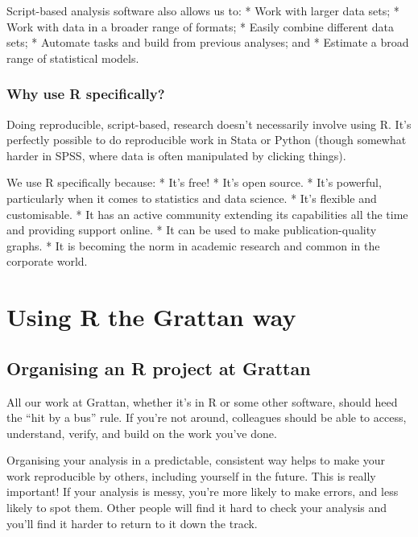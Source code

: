 \documentclass[]{book}
\begin{document}
Script-based analysis software also allows us to:
* Work with larger data sets;
* Work with data in a broader range of formats;
* Easily combine different data sets;
* Automate tasks and build from previous analyses; and
* Estimate a broad range of statistical models.

\hypertarget{why-R}{%
\section{Why use R specifically?}\label{why-R}}

Doing reproducible, script-based, research doesn't necessarily involve using R. It's perfectly possible to do reproducible work in Stata or Python (though somewhat harder in SPSS, where data is often manipulated by clicking things).

We use R specifically because:
* It's free!
* It's open source.
* It's powerful, particularly when it comes to statistics and data science.
* It's flexible and customisable.
* It has an active community extending its capabilities all the time and providing support online.
* It can be used to make publication-quality graphs.
* It is becoming the norm in academic research and common in the corporate world.

\hypertarget{part-using-r-the-grattan-way}{%
\part{Using R the Grattan way}\label{part-using-r-the-grattan-way}}

\hypertarget{organising-projects}{%
\chapter{Organising an R project at Grattan}\label{organising-projects}}

All our work at Grattan, whether it's in R or some other software, should heed the ``hit by a bus'' rule. If you're not around, colleagues should be able to access, understand, verify, and build on the work you've done.

Organising your analysis in a predictable, consistent way helps to make your work reproducible by others, including yourself in the future. This is really important! If your analysis is messy, you're more likely to make errors, and less likely to spot them. Other people will find it hard to check your analysis and you'll find it harder to return to it down the track.
\end{document}
